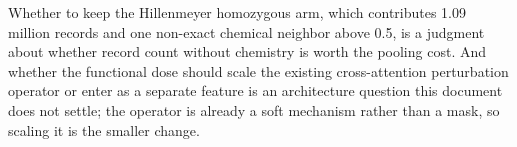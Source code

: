 Whether to keep the Hillenmeyer homozygous arm, which contributes 1.09 million records and one
non-exact chemical neighbor above 0.5, is a judgment about whether record count without
chemistry is worth the pooling cost. And whether the functional dose should scale the existing
cross-attention perturbation operator or enter as a separate feature is an architecture
question this document does not settle; the operator is already a soft mechanism rather than a
mask, so scaling it is the smaller change.
